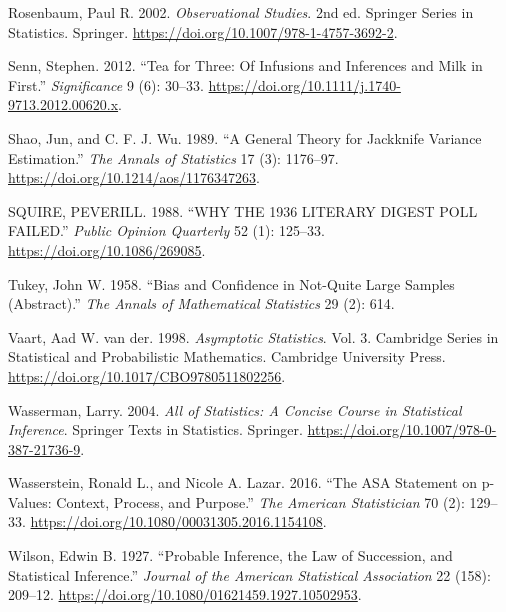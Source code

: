 \documentclass[
  13pt,
  letterpaper,
  DIV=11,
  numbers=noendperiod]{scrreprt}
\newlength{\cslhangindent}
\newenvironment{CSLReferences}[2] %
 {\begin{list}{}{%
  \setlength{\itemindent}{0pt}
  \setlength{\leftmargin}{0pt}
  \setlength{\parsep}{0pt}
  \ifodd #1
   \setlength{\leftmargin}{\cslhangindent}
   \setlength{\itemindent}{-1\cslhangindent}
  \fi
  \setlength{\itemsep}{#2\baselineskip}}}
 {\end{list}}
\theoremstyle{plain}
\theoremstyle{plain}
\theoremstyle{definition}
\theoremstyle{definition}
\theoremstyle{remark}
\begin{document}
\begin{CSLReferences}{1}{1}
Rosenbaum, Paul R. 2002. \emph{Observational Studies}. 2nd ed. Springer
Series in Statistics. Springer.
\url{https://doi.org/10.1007/978-1-4757-3692-2}.

Senn, Stephen. 2012. {``Tea for Three: Of Infusions and Inferences and
Milk in First.''} \emph{Significance} 9 (6): 30--33.
\url{https://doi.org/10.1111/j.1740-9713.2012.00620.x}.

Shao, Jun, and C. F. J. Wu. 1989. {``A General Theory for Jackknife
Variance Estimation.''} \emph{The Annals of Statistics} 17 (3):
1176--97. \url{https://doi.org/10.1214/aos/1176347263}.

SQUIRE, PEVERILL. 1988. {``WHY THE 1936 LITERARY DIGEST POLL FAILED.''}
\emph{Public Opinion Quarterly} 52 (1): 125--33.
\url{https://doi.org/10.1086/269085}.

Tukey, John W. 1958. {``Bias and Confidence in Not-Quite Large Samples
(Abstract).''} \emph{The Annals of Mathematical Statistics} 29 (2): 614.

Vaart, Aad W. van der. 1998. \emph{Asymptotic Statistics}. Vol. 3.
Cambridge Series in Statistical and Probabilistic Mathematics. Cambridge
University Press. \url{https://doi.org/10.1017/CBO9780511802256}.

Wasserman, Larry. 2004. \emph{All of Statistics: A Concise Course in
Statistical Inference}. Springer Texts in Statistics. Springer.
\url{https://doi.org/10.1007/978-0-387-21736-9}.

Wasserstein, Ronald L., and Nicole A. Lazar. 2016. {``The ASA Statement
on p-Values: Context, Process, and Purpose.''} \emph{The American
Statistician} 70 (2): 129--33.
\url{https://doi.org/10.1080/00031305.2016.1154108}.

Wilson, Edwin B. 1927. {``Probable Inference, the Law of Succession, and
Statistical Inference.''} \emph{Journal of the American Statistical
Association} 22 (158): 209--12.
\url{https://doi.org/10.1080/01621459.1927.10502953}.

\end{CSLReferences}
\end{document}
